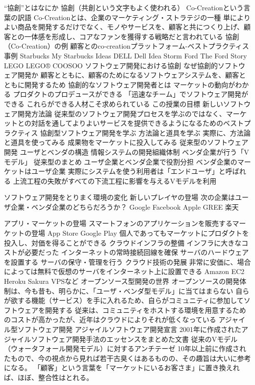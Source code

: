 \documentclass[11pt,a4paper,twoside]{jarticle}
\newcommand{\研究種別}{A}	%
\newcommand{\研究課題名}{コ・クリエイティブなソフトウェア開発のPBL型教育}
\newcommand{\研究機関名}{産業技術大学院大学}
\newcommand{\研究代表者氏名}{中鉢　欣秀}
\newcommand{\研究代表者氏名ふりがな}{ちゅうばち　よしひで}
\newcommand{\本応募effort}{\KLEffort{18}}	%
\newcommand{\研究期間の最終元号年度}{27}	%
\begin{document}
{“協創”とはなにか
協創（共創という文字もよく使われる）
Co-Creationという言葉の訳語
Co-Creationとは、企業のマーケティング・ストラテジの一種
単によりよい商品を開発するだけでなく、モノやサービスを、顧客と共につくり上げ、顧客との一体感を形成し、コアなファンを獲得する戦略だと言われている
協創（Co-Creation）の例
顧客とのco-creationプラットフォーム-ベストプラクティス事例
Starbucks
My Starbucks Ideas
DELL
Dell Idea Storm
Ford
The Ford Story
LEGO
LEGO® COOSOO
ソフトウェア開発における協創
なぜ協創的ソフトウェア開発か
顧客とともに、顧客のためになるソフトウェアシステムを、顧客とともに開発するため
協創的なソフトウェア開発者とは
マーケットの動向がわかる
プロダクトのプロデュースができる
「迅速なチーム」でソフトウェア開発ができる
これらができる人材こそ求められている
この授業の目標
新しいソフトウェア開発方法論
従来型のソフトウェア開発プロセスを学ぶのではなく、マーケットとの対話を通してよりよいサービスを提供できるようになるためのベストプラクティス
協創型ソフトウェア開発を学ぶ
方法論と道具を学ぶ
実際に、方法論と道具を使ってみる
成果物をマーケットに投入してみる
従来型のソフトウェア開発
ユーザとベンダの構造
情報システムの開発組織体制
ベンダ企業が行う「Vモデル」
従来型のまとめ
ユーザ企業とベンダ企業で役割分担
ベンダ企業のマーケットはユーザ企業
実際にシステムを使う利用者は「エンドユーザ」と呼ばれる
上流工程の失敗がすべての下流工程に影響を与えるVモデルを利用

ソフトウェア開発をとりまく環境の変化
新しいプレイヤの登場
次の企業はユーザ企業・ベンダ企業のどちらだろうか？
Google
Facebook
Apple
GREE
楽天


アプリ・マーケットの登場
スマートフォンのアプリケーションを販売するマーケットの登場
App Store
Google Play
個人であってもマーケットにプロダクトを投入し、対価を得ることができる
クラウドインフラの整備
インフラに大きなコストが必要だった
インターネットの常時接続回線を確保
サーバのハードウェアを設置する
サーバの保守・管理を行う
クラウド技術の発展
非常に安価に、場合によっては無料で仮想のサーバをインターネット上に設置できる
Amazon EC2
Heroku
Sakura VPSなど
オープンソース型開発の世界
オープンソースの開発体制は、今も昔も、明らかに、「ユーザ・ベンダ型モデル」に当てはまらない
自らが欲する機能（サービス）を手に入れるため、自らがコミュニティに参加してソフトウェアを開発する
従来は、コミュニティをホストする環境を用意するためのコストが高かったが、近年はクラウドによりそれが低くなっている
アジャイル型ソフトウェア開発
アジャイルソフトウェア開発宣言
2001年に作成されたアジャイルソフトウェア開発手法のエッセンスをまとめた文書
従来のVモデル（ウォータフォール開発モデル）に対するアンチテーゼ
10年以上前に作成されたもので、今の視点から見れば若干古臭くはあるものの、その趣旨は大いに参考になる。
「顧客」という言葉を「マーケットにいるお客さま」に置き換えれば、ほぼ、整合性はとれる。

}
\end{document}
